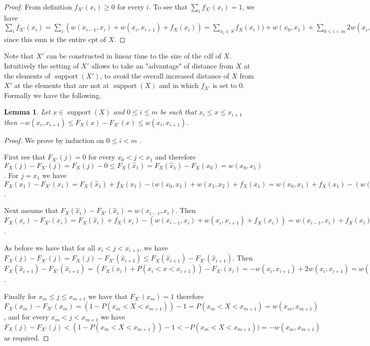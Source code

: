 \documentclass{article}
\newtheorem{lemma}[thm]{Lemma}
\DeclareMathOperator{\support}{support}
\begin{document}
\begin{proof}
	From definition $f_{X'}(x_{i})\geq 0$ for every $i$. To see that $\sum_i f_{X'}(x_{i}) =1$, 
	we have $\sum_i f_{X'}(x_{i}) = \sum_i (w(x_{i-1},x_i) + w(x_i,x_{i+1}) + f_{X}(x_i)) = 	
	\sum _{x_i\in S} f_{X}(x_i)) + w(x_0,x_1)+ \sum_{0 < i < m} 2 w(x_i,x_{i+1}) + w(x_m,x_{m+1}) = 
	\sum _{x_i\in S} P(X= x_i) + P(x_0 < X < X_1)+ \sum_{0 < i < m} P(x_i < X < X_{i+1}) +P(x_m < X < X_{m+1}) = 1$ since this sum is the entire cpt of $X$.	
\end{proof}


Note that $X'$ can be constructed in linear time to the size of the cdf of $X$. Intuitively the setting of $X'$ allows to take an "advantage" of distance from $X$ at the elements of $\support(X')$, to avoid the overall increased distance of $X$ from $X'$ at the elements that are not at $\support(X)$ and in which $f_{X'}$ is set to $0$. Formally we have the following.

\begin{lemma}\label{lem:balance}
	Let $x\in\support(X)$ and $0\leq i\leq m$ be such that $x_i\leq x \leq x_{i+1}$ then $-w(x_i,x_{i+1})\leq F_X(x)-F_{X'}(x)\leq  w(x_i,x_{i+1})$.
\end{lemma}

\begin{proof}	
	
	We prove by induction on $0\leq i < m$ .
	
	First see that $F_{X'}(j) = 0$  for every $x_0<j < x_1$ and therefore $F_X(j)-F_{X'}(j) = F_X(j)-0 \leq F_X(\hat x_1)= F_X(\hat x_1)- F_X(x_0) = w(x_0,x_1)$. For $ j = x_1$ we have $F_X(x_1)-F_{X'}(x_1)=  F_X(\hat x_1) +f_{X}(x_1) - (w(x_0,x_1) + w(x_1,x_2) + f_{X}(x_1) = 
	w(x_0,x_1) +f_{X}(x_1) - (w(x_0,x_1) + w(x_1,x_2) + f_{X}(x_1)) = -w(x_1,x_2)$.
	
	Next assume that $F_X(\hat x_i)-F_{X'}(\hat x_i) = w(x_{i-1},x_i)$.
	Then $F_X(x_i)-F_{X'}(x_i) =  F_X(\hat x_i) +f_{X}(x_i) - (w(x_{i-1},x_i) + w(x_i,x_{i+1}) + f_{X}(x_i)) =  w(x_{i-1},x_i) +f_{X}(x_{i}) - (w(x_{i-1},x_i) + w(x_{i},x_{i+1}) + f_{X}(x_{i})) = -w(x_{i},x_{i+1})$.
	
	As before we have that for all $x_i< j< x_{i+1}$, we have $F_X(j)-F_{X'}(j) = F_X(j)-F_{X'}(\hat x_{i+1}) \leq  F_X(\hat x_{i+1})-F_{X'}(\hat x_{i+1})$. Then $F_X(\hat x_{i+1})-F_{X'}(\hat x_{i+1}) = (F_X(x_i)+ P(x_i < x <x_{i+1})) - F_{X'}(x_i) = -w(x_{i},x_{i+1}) + 2w(x_{i},x_{i+1}) = w(x_{i},x_{i+1}) $.
	
	
	Finally for $x_m\leq j \leq x_{m+1}$ we have that $F_{X'}(x_m)=1$ therefore $F_X(x_m)-F_{X'}(x_m) = (1- P(x_m<X < x_{m+1})) - 1 =  P(x_m<X < x_{m+1}) = w(x_m,x_{m+1})$, and for every $x_m<j<x_{m+1}$ we have $F_X(j) - F_{X'}(j) < (1- P(x_m<X < x_{m+1})) - 1 <  - P(x_m<X < x_{m+1}))  = -w(x_m,x_{m+1})$ as required.
\end{proof}
\end{document}
